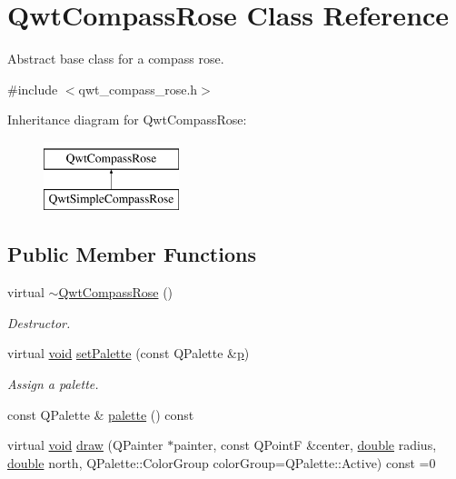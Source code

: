 \hypertarget{class_qwt_compass_rose}{\section{Qwt\-Compass\-Rose Class Reference}
\label{class_qwt_compass_rose}
}


Abstract base class for a compass rose.  




{\ttfamily \#include $<$qwt\-\_\-compass\-\_\-rose.\-h$>$}

Inheritance diagram for Qwt\-Compass\-Rose\-:\begin{figure}[H]
\begin{center}
\leavevmode
\includegraphics[height=2.000000cm]{class_qwt_compass_rose}
\end{center}
\end{figure}
\subsection*{Public Member Functions}
\begin{DoxyCompactItemize}
\item 
virtual \hyperlink{class_qwt_compass_rose_a9e3e5086d7225152cad3a276096753be}{$\sim$\-Qwt\-Compass\-Rose} ()
\begin{DoxyCompactList}\small\item\em Destructor. \end{DoxyCompactList}\item 
virtual \hyperlink{group___u_a_v_objects_plugin_ga444cf2ff3f0ecbe028adce838d373f5c}{void} \hyperlink{class_qwt_compass_rose_ad69f887ed012d6bf6bf2ffeb133e26d5}{set\-Palette} (const Q\-Palette \&\hyperlink{glext_8h_aa5367c14d90f462230c2611b81b41d23}{p})
\begin{DoxyCompactList}\small\item\em Assign a palette. \end{DoxyCompactList}\item 
const Q\-Palette \& \hyperlink{class_qwt_compass_rose_ab2e5c2a4a27c40a175458b96d89394e8}{palette} () const 
\item 
virtual \hyperlink{group___u_a_v_objects_plugin_ga444cf2ff3f0ecbe028adce838d373f5c}{void} \hyperlink{class_qwt_compass_rose_ad974a3035da51a9cfb36fa04eb1c40a6}{draw} (Q\-Painter $\ast$painter, const Q\-Point\-F \&center, \hyperlink{_super_l_u_support_8h_a8956b2b9f49bf918deed98379d159ca7}{double} radius, \hyperlink{_super_l_u_support_8h_a8956b2b9f49bf918deed98379d159ca7}{double} north, Q\-Palette\-::\-Color\-Group color\-Group=Q\-Palette\-::\-Active) const =0
\end{DoxyCompactItemize}



